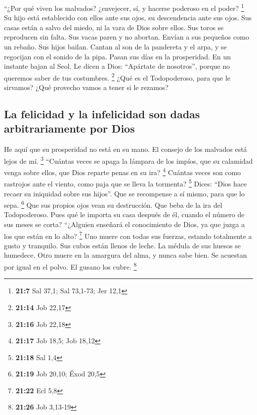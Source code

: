 \begin{paracol}{2}
 ``¿Por qué viven los malvados? ¿envejecer, sí, y hacerse
poderoso en el poder? \footnote{\textbf{21:7} Sal 37,1; Sal 73,1-73; Jer
  12,1}  Su hijo está establecido con ellos ante sus ojos,
su descendencia ante sus ojos.  Sus casas están a salvo
del miedo, ni la vara de Dios sobre ellos.  Sus toros se
reproducen sin falta. Sus vacas paren y no abortan. 
Envían a sus pequeños como un rebaño. Sus hijos bailan. 
Cantan al son de la pandereta y el arpa, y se regocijan con el sonido de
la pipa.  Pasan sus días en la prosperidad. En un
instante bajan al Seol.  Le dicen a Dios: ``Apártate de
nosotros'', porque no queremos saber de tus costumbres. \footnote{\textbf{21:14}
  Job 22,17}  ¿Qué es el Todopoderoso, para que le
sirvamos? ¿Qué provecho vamos a tener si le rezamos?

\hypertarget{la-felicidad-y-la-infelicidad-son-dadas-arbitrariamente-por-dios}{%
\subsection{La felicidad y la infelicidad son dadas arbitrariamente por
Dios}\label{la-felicidad-y-la-infelicidad-son-dadas-arbitrariamente-por-dios}}

 He aquí que su prosperidad no está en su mano. El
consejo de los malvados está lejos de mí. \footnote{\textbf{21:16} Job
  22,18}  ``Cuántas veces se apaga la lámpara de los
impíos, que su calamidad venga sobre ellos, que Dios reparte penas en su
ira? \footnote{\textbf{21:17} Job 18,5; Job 18,12} 
Cuántas veces son como rastrojos ante el viento, como paja que se lleva
la tormenta? \footnote{\textbf{21:18} Sal 1,4}  Dices:
``Dios hace recaer su iniquidad sobre sus hijos''. Que se recompense a
sí mismo, para que lo sepa. \footnote{\textbf{21:19} Job 20,10; Éxod
  20,5}  Que sus propios ojos vean su destrucción. Que
beba de la ira del Todopoderoso.  Pues qué le importa su
casa después de él, cuando el número de sus meses se corta?
 ``¿Alguien enseñará el conocimiento de Dios, ya que
juzga a los que están en lo alto? \footnote{\textbf{21:22} Ecl 5,8}
 Uno muere con todas sus fuerzas, estando totalmente a
gusto y tranquilo.  Sus cubos están llenos de leche. La
médula de sus huesos se humedece.  Otro muere en la
amargura del alma, y nunca sabe bien.  Se acuestan por
igual en el polvo. El gusano los cubre. \footnote{\textbf{21:26} Job
  3,13-19}


\end{paracol}
